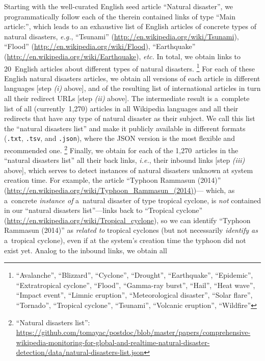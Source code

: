 \documentclass[runningheads,a4paper]{llncs}
\begin{document}
Starting with the well-curated English seed article ``Natural disaster'',
we programmatically follow each of the therein contained links of type ``Main article:'',
which leads to an exhaustive list of English articles
of concrete types of natural disasters,
\emph{e.g.}, ``Tsunami'' (\url{http://en.wikipedia.org/wiki/Tsunami}),
``Flood'' (\url{http://en.wikipedia.org/wiki/Flood}),
``Earthquake'' (\url{http://en.wikipedia.org/wiki/Earthquake}),
\emph{etc.} In total, we obtain links to 20~English articles
about different types of natural disasters.%
\footnote{``Avalanche'', ``Blizzard'', ``Cyclone'', ``Drought'', ``Earthquake'',
``Epidemic'', ``Extratropical cyclone'', ``Flood'', ``Gamma-ray burst'', ``Hail'',
``Heat wave'', ``Impact event'', ``Limnic eruption'', ``Meteorological disaster'',
``Solar flare'', ``Tornado'', ``Tropical cyclone'', ``Tsunami'',
``Volcanic eruption'', ``Wildfire''}
For each of these English natural disasters articles,
we obtain all versions of each article in different languages
[step \emph{(i)} above],
and of the resulting list of international articles
in turn all their redirect URLs [step \emph{(ii)} above].
The intermediate result is a~complete list of all (currently~1,270) articles
in all Wikipedia languages and all their redirects
that have any type of natural disaster as their subject.
We call this list the ``natural disasters list''
and make it publicly available in different formats
(\texttt{.txt}, \texttt{.tsv}, and \texttt{.json}), where the JSON version
is the most flexible and recommended one.%
\footnote{``Natural disasters list'':
\url{https://github.com/tomayac/postdoc/blob/master/papers/comprehensive-wikipedia-monitoring-for-global-and-realtime-natural-disaster-detection/data/natural-disasters-list.json}}
Finally, we obtain for each of the 1,270~articles
in the ``natural disasters list''
all their back links, \emph{i.e.}, their inbound links
[step \emph{(iii)} above], which serves to detect
instances of natural disasters unknown at system creation time.
For example, the article ``Typhoon Rammasun (2014)''
(\url{http://en.wikipedia.org/wiki/Typhoon_Rammasun_(2014)})---%
which, as a~concrete \emph{instance of} a~natural disaster
of type tropical cyclone, is \emph{not} contained in our
``natural disasters list''---links back to ``Tropical cyclone''
(\url{http://en.wikipedia.org/wiki/Tropical_cyclone}),
so we can identify ``Typhoon Rammasun (2014)'' as \emph{related to}
tropical cyclones (but not necessarily \emph{identify as} a~tropical cyclone),
even if at the system's creation time the typhoon did not exist yet.
Analog to the inbound links, we obtain all
\end{document}

